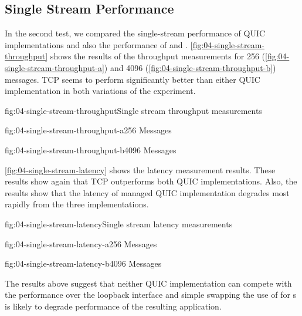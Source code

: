 \subsection{Single Stream Performance}

In the second test, we compared the single-stream performance of QUIC implementations and also the
performance of \TcpClient{} and \SslStream{}. \autoref{fig:04-single-stream-throughput} shows the
results of the throughput measurements for \SI{256}{\byte}
(\autoref{fig:04-single-stream-throughput-a}) and \SI{4096}{\byte}
(\autoref{fig:04-single-stream-throughput-b}) messages. TCP seems to perform significantly better
than either QUIC implementation in both variations of the experiment.

\begin{myFigure}{fig:04-single-stream-throughput}{Single stream throughput measurements}
\begin{mySubfigure}{0.49\linewidth}{fig:04-single-stream-throughput-a}{\SI{256}{\byte} Messages}
\footnotesize

\end{mySubfigure}
\begin{mySubfigure}{0.49\linewidth}{fig:04-single-stream-throughput-b}{\SI{4096}{\byte} Messages}
\footnotesize

\end{mySubfigure}
\end{myFigure}

\autoref{fig:04-single-stream-latency} shows the latency measurement results. These results show
again that TCP outperforms both QUIC implementations. Also, the results show that the latency of
managed QUIC implementation degrades most rapidly from the three implementations.

\begin{myFigure}{fig:04-single-stream-latency}{Single stream latency measurements}
\begin{mySubfigure}{0.49\linewidth}{fig:04-single-stream-latency-a}{\SI{256}{\byte} Messages}
\footnotesize

\end{mySubfigure}
\begin{mySubfigure}{0.49\linewidth}{fig:04-single-stream-latency-b}{\SI{4096}{\byte} Messages}
\footnotesize

\end{mySubfigure}
\end{myFigure}

The results above suggest that neither QUIC implementation can compete with the \SslStream{}
performance over the loopback interface and simple swapping the use of \SslStream{} for
\QuicStream{}s is likely to degrade performance of the resulting application.

